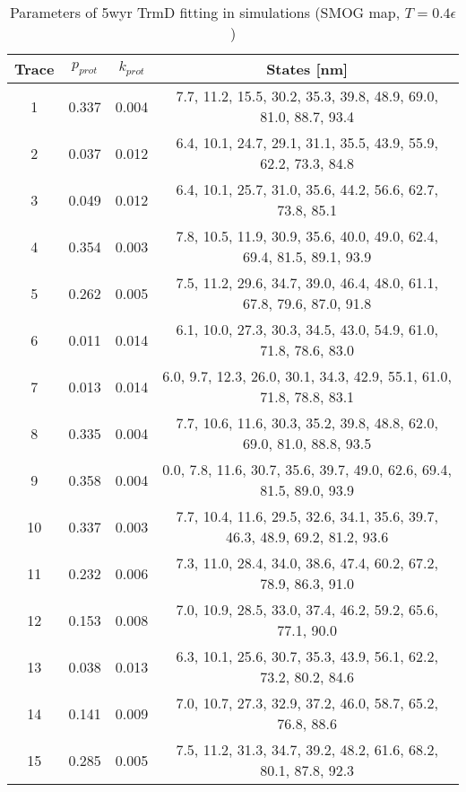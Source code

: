 \begin{table}
    \tiny
    \centering
    \caption{Parameters of 5wyr TrmD fitting in simulations (SMOG map, $T=0.4\epsilon$)}
    \label{tab:5wyr-sc-parameters}
    \begin{tabular}{c|c|c|c}
        \textbf{Trace} & \textbf{$p_{prot}$} & \textbf{$k_{prot}$} & \textbf{States [nm]}\\\hline
        1 & 0.337 & 0.004 & 7.7, 11.2, 15.5, 30.2, 35.3, 39.8, 48.9, 69.0, 81.0, 88.7, 93.4\\
        2 & 0.037 & 0.012 & 6.4, 10.1, 24.7, 29.1, 31.1, 35.5, 43.9, 55.9, 62.2, 73.3, 84.8\\
        3 & 0.049 & 0.012 & 6.4, 10.1, 25.7, 31.0, 35.6, 44.2, 56.6, 62.7, 73.8, 85.1\\
        4 & 0.354 & 0.003 & 7.8, 10.5, 11.9, 30.9, 35.6, 40.0, 49.0, 62.4, 69.4, 81.5, 89.1, 93.9\\
        5 & 0.262 & 0.005 & 7.5, 11.2, 29.6, 34.7, 39.0, 46.4, 48.0, 61.1, 67.8, 79.6, 87.0, 91.8\\
        6 & 0.011 & 0.014 & 6.1, 10.0, 27.3, 30.3, 34.5, 43.0, 54.9, 61.0, 71.8, 78.6, 83.0\\
        7 & 0.013 & 0.014 & 6.0, 9.7, 12.3, 26.0, 30.1, 34.3, 42.9, 55.1, 61.0, 71.8, 78.8, 83.1\\
        8 & 0.335 & 0.004 & 7.7, 10.6, 11.6, 30.3, 35.2, 39.8, 48.8, 62.0, 69.0, 81.0, 88.8, 93.5\\
        9 & 0.358 & 0.004 & 0.0, 7.8, 11.6, 30.7, 35.6, 39.7, 49.0, 62.6, 69.4, 81.5, 89.0, 93.9\\
        10 & 0.337 & 0.003 & 7.7, 10.4, 11.6, 29.5, 32.6, 34.1, 35.6, 39.7, 46.3, 48.9, 69.2, 81.2, 93.6\\
        11 & 0.232 & 0.006 & 7.3, 11.0, 28.4, 34.0, 38.6, 47.4, 60.2, 67.2, 78.9, 86.3, 91.0\\
        12 & 0.153 & 0.008 & 7.0, 10.9, 28.5, 33.0, 37.4, 46.2, 59.2, 65.6, 77.1, 90.0\\
        13 & 0.038 & 0.013 & 6.3, 10.1, 25.6, 30.7, 35.3, 43.9, 56.1, 62.2, 73.2, 80.2, 84.6\\
        14 & 0.141 & 0.009 & 7.0, 10.7, 27.3, 32.9, 37.2, 46.0, 58.7, 65.2, 76.8, 88.6\\
        15 & 0.285 & 0.005 & 7.5, 11.2, 31.3, 34.7, 39.2, 48.2, 61.6, 68.2, 80.1, 87.8, 92.3\\
    \end{tabular}
\end{table}


